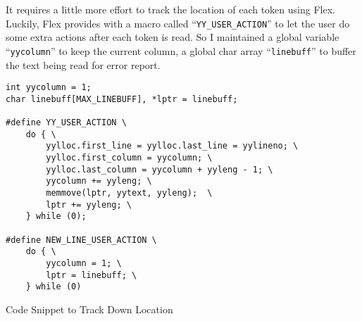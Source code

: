 \documentclass[10pt, a4paper]{article}
\begin{document}
It requires a little more effort to track the location of each token using
Flex. Luckily, Flex provides with a macro called ``\texttt{YY\_USER\_ACTION}''
to let the user do some extra actions after each token is read. So I maintained
a global variable ``\texttt{yycolumn}'' to keep the current column, a global
char array ``\texttt{linebuff}'' to buffer the text being read for error
report.
\begin{listing}[H]
    \centering
    \begin{verbatim}
int yycolumn = 1;
char linebuff[MAX_LINEBUFF], *lptr = linebuff;

#define YY_USER_ACTION \
    do { \
        yylloc.first_line = yylloc.last_line = yylineno; \
        yylloc.first_column = yycolumn; \
        yylloc.last_column = yycolumn + yyleng - 1; \
        yycolumn += yyleng; \
        memmove(lptr, yytext, yyleng);  \
        lptr += yyleng; \
    } while (0);

#define NEW_LINE_USER_ACTION \
    do { \
        yycolumn = 1; \
        lptr = linebuff; \
    } while (0)
\end{verbatim}
\caption {Code Snippet to Track Down Location}
\end{listing}
\end{document}
